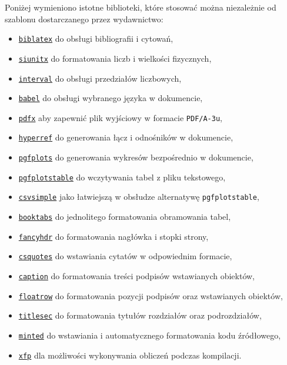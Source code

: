 Poniżej wymieniono istotne biblioteki, które stosować można niezależnie od szablonu dostarczanego przez wydawnictwo:
\begin{itemize}
\item \texttt{\href{https://ctan.org/pkg/biblatex}{biblatex}} do obsługi bibliografii i cytowań,
\item \texttt{\href{https://ctan.org/pkg/siunitx}{siunitx}} do formatowania liczb i wielkości fizycznych,
\item \texttt{\href{https://ctan.org/pkg/interval}{interval}} do obsługi przedziałów liczbowych,
\item \texttt{\href{https://ctan.org/pkg/babel-polish}{babel}} do obsługi wybranego języka w dokumencie,
\item \texttt{\href{https://ctan.org/pkg/pdfx}{pdfx}} aby zapewnić plik wyjściowy w formacie \texttt{PDF/A-3u},
\item \texttt{\href{https://ctan.org/pkg/hyperref}{hyperref}} do generowania łącz i odnośników w dokumencie,
\item \texttt{\href{https://ctan.org/pkg/pgfplots}{pgfplots}} do generowania wykresów bezpośrednio w dokumencie,
\item \texttt{\href{https://ctan.org/pkg/pgfplots}{pgfplotstable}} do wczytywania tabel z pliku tekstowego,
\item \texttt{\href{https://ctan.org/pkg/csvsimple}{csvsimple}} jako łatwiejszą w obsłudze alternatywę \texttt{pgfplotstable},
\item \texttt{\href{https://ctan.org/pkg/booktabs}{booktabs}} do jednolitego formatowania obramowania tabel,
\item \texttt{\href{https://ctan.org/pkg/fancyhdr}{fancyhdr}} do formatowania nagłówka i stopki strony,
\item \texttt{\href{https://ctan.org/pkg/csquotes}{csquotes}} do wstawiania cytatów w odpowiednim formacie,
\item \texttt{\href{https://ctan.org/pkg/caption}{caption}} do formatowania treści podpisów wstawianych obiektów,
\item \texttt{\href{https://ctan.org/pkg/floatrow}{floatrow}} do formatowania pozycji podpisów oraz wstawianych obiektów,
\item \texttt{\href{https://ctan.org/pkg/titlesec}{titlesec}} do formatowania tytułów rozdziałów oraz podrozdziałów,
\item \texttt{\href{https://ctan.org/pkg/minted}{minted}} do wstawiania i automatycznego formatowania kodu źródłowego,
\item \texttt{\href{https://ctan.org/pkg/xfp}{xfp}} dla możliwości wykonywania obliczeń podczas kompilacji.
\end{itemize}

